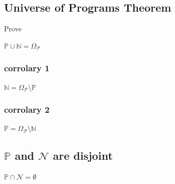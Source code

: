 \documentclass[11pt]{article}
\begin{document}
\subsection{Universe of Programs Theorem}
Prove
\begin{center}
$
\mathbb{P} \cup \mathbb{N} = \Omega_{\mathcal{P}}
$
\end{center}

\subsubsection{corrolary 1}
\begin{center}
$
\mathbb{N}  = \Omega_{\mathcal{P}} \setminus \mathbb{P}
$
\end{center}

\subsubsection{corrolary 2}
\begin{center}
$
\mathbb{P}  = \Omega_{\mathcal{P}} \setminus \mathbb{N}
$
\end{center}

\subsection{$\mathbb{P}$ and $\mathcal{N}$ are disjoint}
\begin{center}
\vspace{2mm}
$
\mathbb{P} \cap \mathcal{N} = \emptyset
$
\end{center}
\end{document}
